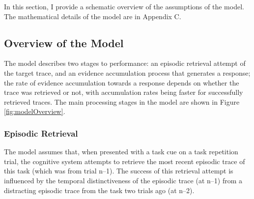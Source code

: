 \documentclass[a4paper, jou, natbib]{apa6}
\begin{document}
In this section, I provide a schematic overview of the assumptions of the model. The mathematical details of the model are in Appendix C.

\subsection{Overview of the Model}
The model describes two stages to performance: an episodic retrieval attempt of the target trace, and an evidence accumulation process that generates a response; the rate of evidence accumulation towards a response depends on whether the trace was retrieved or not, with accumulation rates being faster for successfully retrieved traces. The main processing stages in the model are shown in Figure \ref{fig:modelOverview}. 

\subsubsection{Episodic Retrieval}
 The model assumes that, when presented with a task cue on a task repetition trial, the cognitive system attempts to retrieve the most recent episodic trace of this task (which was from trial n--1). The success of this retrieval attempt is influenced by the temporal distinctiveness of the episodic trace (at n--1) from a distracting episodic trace from the task two trials ago (at n--2).  
\end{document}
